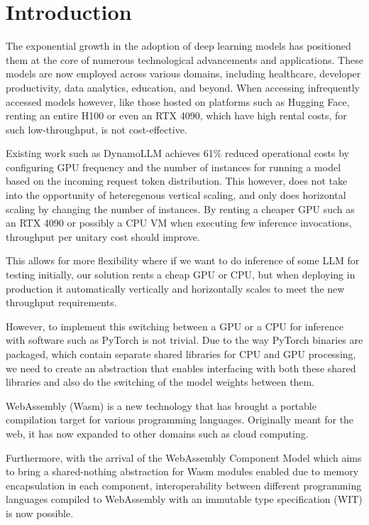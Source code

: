 
\section{Introduction}

The exponential growth in the adoption of deep learning models has positioned them at the core of numerous technological advancements and applications. These models are now employed across various domains, including healthcare, developer productivity, data analytics, education, and beyond. When accessing infrequently accessed models however, like those hosted on platforms such as Hugging Face, renting an entire H100 or even an RTX 4090, which have high rental costs, for such low-throughput, is not cost-effective.

Existing work such as DynamoLLM \cite{dynamollm} achieves 61\% reduced operational costs by configuring GPU frequency and the number of instances for running a model based on the incoming request token distribution. This however, does not take into the opportunity of heteregenous vertical scaling, and only does horizontal scaling by changing the number of instances. By renting a cheaper GPU such as an RTX 4090 or possibly a CPU VM when executing few inference invocations, throughput per unitary cost should improve.

This allows for more flexibility where if we want to do inference of some LLM for testing initially, our solution rents a cheap GPU or CPU, but when deploying in production it automatically vertically and horizontally scales to meet the new throughput requirements.

However, to implement this switching between a GPU or a CPU for inference with software such as PyTorch is not trivial. Due to the way PyTorch binaries are packaged, which contain separate shared libraries for CPU and GPU processing, we need to create an abstraction that enables interfacing with both these shared libraries and also do the switching of the model weights between them.

WebAssembly (Wasm) is a new technology that has brought a portable compilation target for various programming languages. Originally meant for the web, it has now expanded to other domains such as cloud computing.

Furthermore, with the arrival of the WebAssembly Component Model which aims to bring a shared-nothing abstraction for Wasm modules enabled due to memory encapsulation in each component, interoperability between different programming languages compiled to WebAssembly with an immutable type specification (WIT) is now possible.

